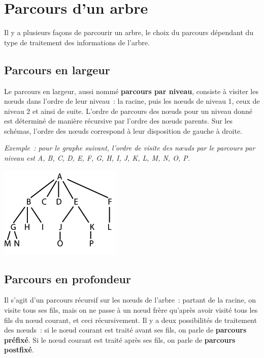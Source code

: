 \section{Parcours d'un arbre}

	Il y a plusieurs façons de parcourir un arbre, le choix du parcours 
	dépendant du type de traitement des informations de l'arbre.

	\subsection{Parcours en largeur}

		Le parcours en largeur, aussi nommé \textbf{parcours par niveau}, 
		consiste à visiter les n{\oe}uds dans l'ordre de leur niveau~: 
		la racine, puis les n{\oe}uds de niveau 1, ceux de niveau 2 
		et ainsi de suite. L'ordre de parcours des n{\oe}uds pour 
		un niveau donné est déterminé de manière récursive par 
		l'ordre des n{\oe}uds parents. Sur les schémas, l'ordre 
		des n{\oe}uds correspond à leur disposition de gauche à droite.

		{\itshape
		Exemple~: pour le graphe suivant, l'ordre de visite des n{\oe}uds 
		par le parcours par niveau est A, B, C, D, E, F, G, H,
		I, J, K, L, M, N, O, P.}

		\begin{center}
		\includegraphics[width=5.821cm,height=4.366cm]{image/a2012Logique2eme-img032.png}
		\end{center}
	
	\subsection{Parcours en profondeur}
	
		Il s'agit d'un parcours récursif sur les n{\oe}uds de l'arbre~: 
		partant de la racine, on visite tous ses fils, mais on
			ne passe à un n{\oe}ud frère qu'après avoir visité tous les 
			fils du n{\oe}ud courant, et ceci récursivement. Il y a
			deux possibilités de traitement des n{\oe}uds~: si le 
			n{\oe}ud courant est traité avant ses fils, on parle de
			\textbf{parcours préfixé}. Si le n{\oe}ud courant est 
			traité après ses fils, on parle de \textbf{parcours postfixé}.

